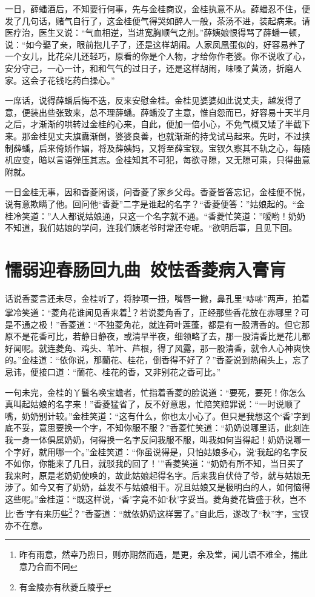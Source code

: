 \documentclass[12pt,oneside]{book}
\begin{document}
一日，薛蟠酒后，不知要行何事，先与金桂商议，金桂执意不从。薛蟠忍不住，便发了几句话，赌气自行了，这金桂便气得哭如醉人一般，茶汤不进，装起病来。请医疗治，医生又说：“气血相逆，当进宽胸顺气之剂。”薛姨娘恨得骂了薛蟠一顿，说：“如今娶了亲，眼前抱儿子了，还是这样胡闹。人家凤凰蛋似的，好容易养了一个女儿，比花朵儿还轻巧，原看的你是个人物，才给你作老婆。你不说收了心，安分守己，一心一计，和和气气的过日子，还是这样胡闹，味嗓了黄汤，折磨人家。这会子花钱吃药白操心。”

一席话，说得薛蟠后悔不迭，反来安慰金桂。金桂见婆婆如此说丈夫，越发得了意，便装出些张致来，总不理薛蟠。薛蟠没了主意，惟自怨而已，好容易十天半月之后，才渐渐的哄转过金桂的心来，自此，便加一倍小心，不免气概又矮了半截下来。那金桂见丈夫旗纛渐倒，婆婆良善，也就渐渐的持戈试马起来。先时，不过挟制薛蟠，后来倚娇作媚，将及薛姨妈，又将至薛宝钗。宝钗久察其不轨之心，每随机应变，暗以言语弹压其志。金桂知其不可犯，每欲寻隙，又无隙可乘，只得曲意附就。

一日金桂无事，因和香菱闲谈，问香菱了家乡父母。香菱皆答忘记，金桂便不悦，说有意欺瞒了他。回问他“香菱”二字是谁起的名字？“香菱便答：”姑娘起的。“金桂冷笑道：”人人都说姑娘通，只这一个名字就不通。“香菱忙笑道：”嗳哟！奶奶不知道，我们姑娘的学问，连我们姨老爷时常还夸呢。“欲明后事，且见下回。

 
\chapter{懦弱迎春肠回九曲~姣怯香菱病入膏肓}
话说香菱言还未尽，金桂听了，将脖项一扭，嘴唇一撇，鼻孔里“哧哧”两声，拍着掌冷笑道：“菱角花谁闻见香来着\footnote{昨有雨意，然幸乃煦日，则亦期然而遇，是更，余及堂，闻儿语不难全，揣此意乃合而不同}？若说菱角香了，正经那些香花放在赤哪里？可是不通之极！”香菱道：“不独菱角花，就连荷叶莲蓬，都是有一股清香的。但它那原不是花香可比，若静日静夜，或清早半夜，细领略了去，那一股清香比是花儿都好闻呢。就连菱角、鸡头、苇叶、芦根，得了风露，那一股清香，就令人心神爽快的。”金桂道：“依你说，那蘭花、桂花，倒香得不好了？”香菱说到热闹头上，忘了忌讳，便接口道：“蘭花、桂花的香，又非别花之香可比。”

一句未完，金桂的丫鬟名唤宝蟾者，忙指着香菱的脸说道：“要死，要死！你怎么真叫起姑娘的名字来！”香菱猛省了，反不好意思，忙陪笑赔罪说：“一时说顺了嘴，奶奶别计较。”金桂笑道：“这有什么，你也太小心了。但只是我想这个‘香’字到底不妥，意思要换一个字，不知你服不服？”香菱忙笑道：“奶奶说哪里话，此刻连我一身一体俱属奶奶，何得换一名字反问我服不服，叫我如何当得起！奶奶说哪一个字好，就用哪一个。”金桂笑道：“你虽说得是，只怕姑娘多心，说‘我起的名字反不如你，你能来了几日，就驳我的回了！’”香菱笑道：“奶奶有所不知，当日买了我来时，原是老奶奶使唤的，故此姑娘起得名字。后来我自伏侍了爷，就与姑娘无涉了。如今又有了奶奶，益发不与姑娘相干。况且姑娘又是极明白的人，如何恼得这些呢。”金桂道：“既这样说，‘香’字竟不如‘秋’字妥当。菱角菱花皆盛于秋，岂不比‘香’字有来历些\footnote{有金陵亦有秋菱丘陵乎}？”香菱道：“就依奶奶这样罢了。”自此后，遂改了“秋”字，宝钗亦不在意。
\end{document}
